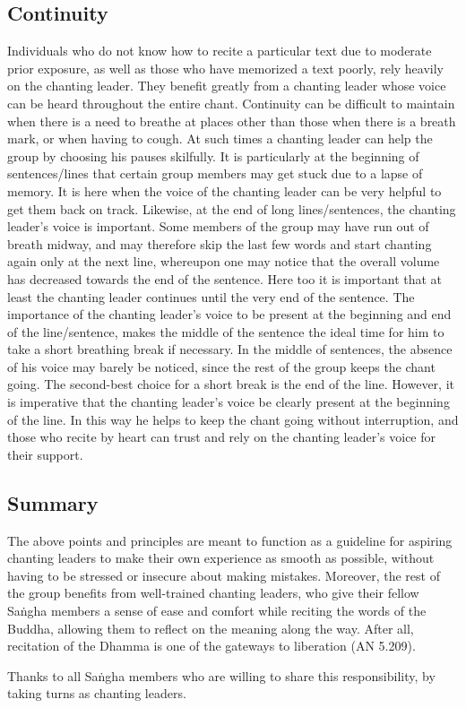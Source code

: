 \subsection*{Continuity}
\begin{justify}
  Individuals who do not know how to recite a particular text due to moderate prior exposure, as well as those who have memorized a text poorly, rely heavily on the chanting leader. They benefit greatly from a chanting leader whose voice can be heard throughout the entire chant. Continuity can be difficult to maintain when there is a need to breathe at places other than those when there is a breath mark, or when having to cough. At such times a chanting leader can help the group by choosing his pauses skilfully. It is particularly at the beginning of sentences/lines that certain group members may get stuck due to a lapse of memory. It is here when the voice of the chanting leader can be very helpful to get them back on track. Likewise, at the end of long lines/sentences, the chanting leader's voice is important. Some members of the group may have run out of breath midway, and may therefore skip the last few words and start chanting again only at the next line, whereupon one may notice that the overall volume has decreased towards the end of the sentence. Here too it is important that at least the chanting leader continues until the very end of the sentence. The importance of the chanting leader's voice to be present at the beginning and end of the line/sentence, makes the middle of the sentence the ideal time for him to take a short breathing break if necessary. In the middle of sentences, the absence of his voice may barely be noticed, since the rest of the group keeps the chant going. The second-best choice for a short break is the end of the line. However, it is imperative that the chanting leader's voice be clearly present at the beginning of the line. In this way he helps to keep the chant going without interruption, and those who recite by heart can trust and rely on the chanting leader's voice for their support.
\end{justify}

\subsection*{Summary}
\begin{justify}
  The above points and principles are meant to function as a guideline for aspiring chanting leaders to make their own experience as smooth as possible, without having to be stressed or insecure about making mistakes. Moreover, the rest of the group benefits from well-trained chanting leaders, who give their fellow Saṅgha members a sense of ease and comfort while reciting the words of the Buddha, allowing them to reflect on the meaning along the way. After all, recitation of the Dhamma is one of the gateways to liberation (AN 5.209).
\end{justify}

\begin{justify}
  Thanks to all Saṅgha members who are willing to share this responsibility, by taking turns as chanting leaders.
\end{justify}
